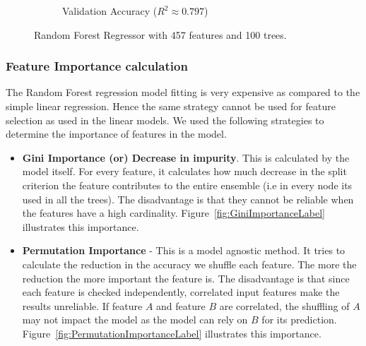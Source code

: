 \documentclass[11pt]{article}
\begin{document}
\begin{figure}
\begin{subfigure}[b]{0.45\textwidth}
        \caption{Validation Accuracy ($R^2 \approx 0.797$)}
        \label{fig:ValidationAccuracyRFM}
     \end{subfigure}
     \caption{Random Forest Regressor with 457 features and 100 trees.}
     \label{fig:RFMModel}
\end{figure}


\subsubsection{Feature Importance calculation}
The Random Forest regression model fitting is very expensive as compared to the simple linear regression.
Hence the same strategy cannot be used for feature selection as used in the linear models.
We used the following strategies to determine the importance of features in the model.

\begin{itemize}
\item \textbf{Gini Importance (or) Decrease in impurity}.  This is calculated by the model itself.
For every feature,  it calculates how much decrease in the split criterion the feature contributes to the entire ensemble (i.e in every node its used in all the trees).
The disadvantage is that they cannot be reliable when the features have a high cardinality.  Figure~\ref{fig:GiniImportanceLabel} illustrates this importance.
\item \textbf{Permutation Importance} - This is a model agnostic method.
It tries to calculate the reduction in the accuracy we shuffle each feature.
The more the reduction the more important the feature is.
The disadvantage is that since each feature is checked independently,  correlated input features make the results unreliable. 
If feature $A$ and feature $B$ are correlated,  the shuffling of $A$ may not impact the model as the model can rely on $B$ for its prediction.  Figure~\ref{fig:PermutationImportanceLabel} illustrates this importance.
\end{itemize}
\end{document}
